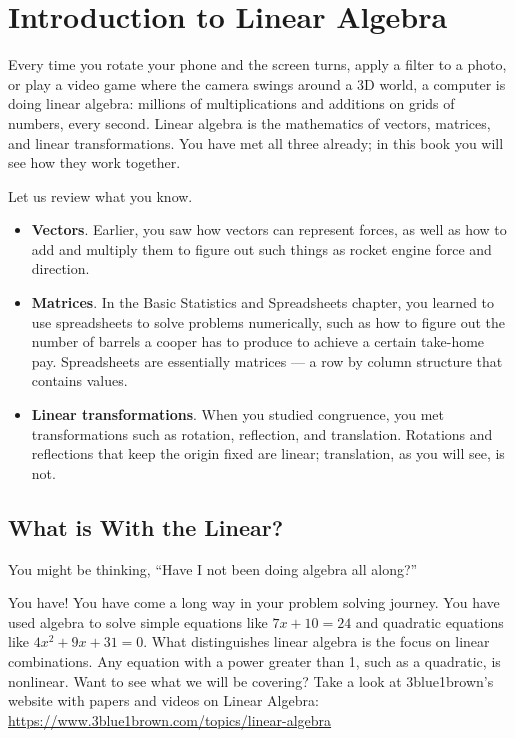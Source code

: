 \chapter{Introduction to Linear Algebra}

Every time you rotate your phone and the screen turns, apply a filter to a
photo, or play a video game where the camera swings around a 3D world, a
computer is doing linear algebra: millions of multiplications and
additions on grids of numbers, every second. Linear algebra is the
mathematics of vectors, matrices, and linear transformations. You have met
all three already; in this book you will see how they work together.  

Let us review what you know.

\begin{itemize}
\item \textbf{Vectors}. Earlier, you saw how vectors can represent 
forces, as well as how to add and multiply them to figure out such things as 
rocket engine force and direction. 
\item \textbf{Matrices}. In the Basic Statistics and Spreadsheets chapter, you learned to use spreadsheets to 
solve problems numerically, such as how to figure out the number of barrels a 
cooper has to produce to achieve a certain take-home pay. Spreadsheets are 
essentially matrices --- a row by column structure that contains values. 
\item \textbf{Linear transformations}. When you studied congruence, you met transformations such as rotation, reflection, and translation. Rotations and reflections
that keep the origin fixed are linear; translation, as you will see, is not. 
\end{itemize}

\section{What is With the Linear?}

You might be thinking, ``Have I not been doing algebra all along?'' 

You have! You have come a long way in your problem solving journey. You have 
used algebra to solve simple equations like $7x + 10 = 24$ and quadratic 
equations like $4x^{2} + 9x + 31 = 0$. What distinguishes linear algebra is 
the focus on linear combinations. Any equation with a power greater than 1, 
such as a quadratic, is nonlinear.
Want to see what we will be covering? Take a look at 3blue1brown's website with papers and videos on Linear Algebra: 
\url{https://www.3blue1brown.com/topics/linear-algebra}

